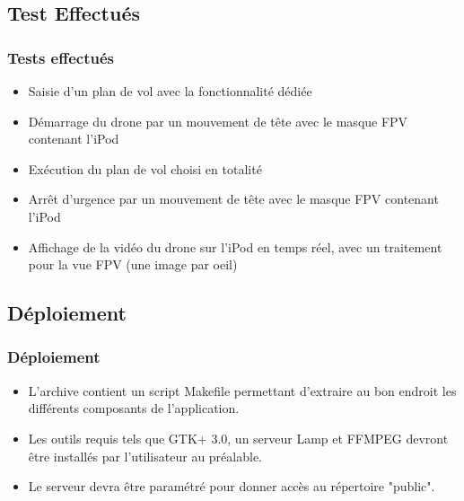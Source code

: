 \documentclass{beamer}
\begin{document}
	
	
	\begin{frame}
		\section{Test Effectués}
		\begin{center}
		\frametitle{Tests effectués}
           	\begin{itemize}
           	    \item Saisie d'un plan de vol avec la fonctionnalité dédiée
                \item Démarrage du drone par un mouvement de tête avec le masque FPV contenant l'iPod
                \item Exécution du plan de vol choisi en totalité
                \item Arrêt d'urgence par un mouvement de tête avec le masque FPV contenant l'iPod
                \item Affichage de la vidéo du drone sur l'iPod en temps réel, avec un traitement pour la vue FPV (une image par oeil)
            \end{itemize}
		\end{center}
	\end{frame}

	
	
	\begin{frame}
	\section{Déploiement}
		\begin{center}
		\frametitle{Déploiement}
		\begin{itemize}
	    \item	L'archive contient un script Makefile permettant d'extraire au bon endroit les différents composants de l'application.\\
	    \item	Les outils requis tels que GTK+ 3.0, un serveur Lamp et FFMPEG devront être installés par l'utilisateur au préalable.\\
	    \item	Le serveur devra être paramétré pour donner accès au répertoire "public".\\
		\end{itemize}
		\end{center}
	\end{frame}
	
\end{document}
